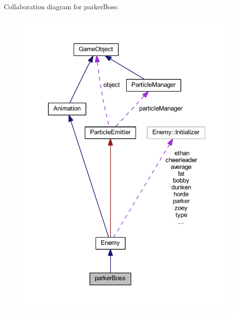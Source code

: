 Collaboration diagram for parker\+Boss\+:\nopagebreak
\begin{figure}[H]
\begin{center}
\leavevmode
\includegraphics[width=330pt]{classparker_boss__coll__graph}
\end{center}
\end{figure}
